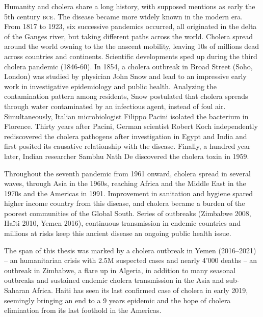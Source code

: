 Humanity and cholera share a long history, with supposed mentions as early the 5th century \textsc{bce}. The disease became more widely known in the modern era. From 1817 to 1923, six successive pandemics occurred, all originated in the delta of the Ganges river, but taking different paths across the world. Cholera spread around the world owning to the the nascent mobility, leaving 10s of millions dead across countries and continents.  Scientific developments sped up during the third cholera pandemic (1846-60). In 1854, a cholera outbreak in Broad Street (Soho, London) was studied by physician John Snow and lead to an impressive early work in investigative epidemiology and public health. Analyzing the contamination pattern among residents, Snow postulated that cholera spreads through water contaminated by an infectious agent, instead of foul air.  Simultaneously, Italian microbiologist Filippo Pacini isolated the bacterium in Florence\cite{Pacini:OsservazioniMicroscopicheDeduzioni:1854}. Thirty years after Pacini, German scientist Robert Koch independently rediscovered the cholera pathogens after investigation in Egypt and India and first posited its causative relationship with the disease. Finally, a hundred year later, Indian researcher Sambhu Nath De discovered the cholera toxin in 1959\cite{De:ExperimentalStudyAction:1951}.

Throughout the seventh pandemic from 1961 onward, cholera spread in several waves, through Asia in the 1960s, reaching Africa and the Middle East in the 1970s and the Americas in 1991\cite{Mutreja:EvidenceSeveralWaves:2011}. Improvement in sanitation and hygiene spared higher income country from this disease, and cholera became a burden of the poorest communities of the Global South. Series of outbreaks (\eg Zimbabwe 2008, Haïti 2010, Yemen 2016), continuous transmission in endemic countries and millions at risks keep this ancient disease an ongoing public health issue.

The span of this thesis was marked by a cholera outbreak in Yemen (2016--2021) -- an humanitarian crisis with 2.5M suspected cases and nearly 4'000 deaths -- an outbreak in Zimbabwe, a flare up in Algeria, in addition to many seasonal outbreaks and sustained endemic cholera transmission in the Asia and sub-Saharan Africa. Haiti has seen its last confirmed case of cholera in early 2019, seemingly bringing an end to a 9 years epidemic and the hope of cholera elimination from its last foothold in the Americas. 

